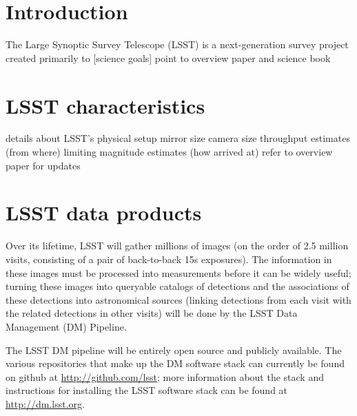 \documentclass{iau}
\begin{document}
\section{Introduction}

The Large Synoptic Survey Telescope (LSST) is a next-generation survey
project created primarily to [science goals]
point to overview paper and science book

\section{LSST characteristics}
details about LSST's physical setup
mirror size
camera size
throughput estimates (from where)
limiting magnitude estimates (how arrived at)
refer to overview paper for updates

\section{LSST data products}

Over its lifetime, LSST will gather millions of images (on the order
of 2.5 million visits, consisting of a pair of back-to-back 15s
exposures). The information in these images must be processed into
measurements before it can be widely useful; turning these images into
queryable catalogs of detections and the associations of these
detections into astronomical sources (linking detections from each
visit with the related detections in other visits) will be done by the
LSST Data Management (DM) Pipeline.

The LSST DM pipeline will be entirely open source and publicly
available. The various repositories that make up the DM software stack
can currently be found on github at \url{http://github.com/lsst};
more information about the stack and instructions for installing the
LSST software stack can be found at \url{http://dm.lsst.org}.
\end{document}
